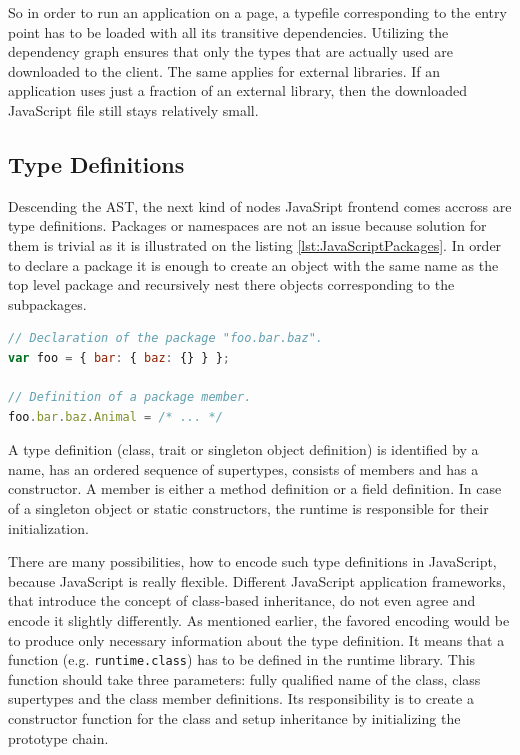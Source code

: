 \documentclass[12pt,a4paper]{report}
\begin{document}
So in order to run an application on a page, a typefile corresponding to the entry point has to be loaded with all its transitive dependencies. Utilizing the dependency graph ensures that only the types that are actually used are downloaded to the client. The same applies for external libraries. If an application uses just a fraction of an external library, then the downloaded JavaScript file still stays relatively small.

\subsection{Type Definitions}

Descending the AST, the next kind of nodes JavaSript frontend comes accross are type definitions. Packages or namespaces are not an issue because solution for them is trivial as it is illustrated on the listing \ref{lst:JavaScriptPackages}. In order to declare a package it is enough to create an object with the same name as the top level package and recursively nest there objects corresponding to the subpackages.

\begin{lstlisting}[language=JavaScript,caption={Packages in JavaScript.},label={lst:JavaScriptPackages}]
// Declaration of the package "foo.bar.baz".
var foo = { bar: { baz: {} } };

// Definition of a package member.
foo.bar.baz.Animal = /* ... */
\end{lstlisting}

A type definition (class, trait or singleton object definition) is identified by a name, has an ordered sequence of supertypes, consists of members and has a constructor. A member is either a method definition or a field definition. In case of a singleton object or static constructors, the runtime is responsible for their initialization.

There are many possibilities, how to encode such type definitions in JavaScript, because JavaScript is really flexible. Different JavaScript application frameworks, that introduce the concept of class-based inheritance, do not even agree and encode it slightly differently. As mentioned earlier, the favored encoding would be to produce only necessary information about the type definition. It means that a function (e.g. \texttt{runtime.class}) has to be defined in the runtime library. This function should take three parameters: fully qualified name of the class, class supertypes and the class member definitions. Its responsibility is to create a constructor function for the class and setup inheritance by initializing the prototype chain. 
\end{document}
